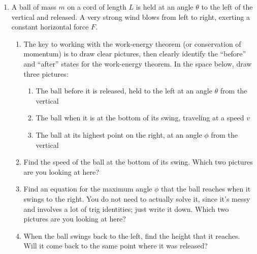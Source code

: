 \documentclass[12pt]{article}
\begin{document}
\begin{enumerate}
 \item{A ball of mass $m$ on a cord of length $L$ is held at an angle $\theta$ to the left of the vertical and released. A very strong wind blows from left to right, exerting a constant horizontal force $F$. }

     \begin{enumerate}
     	\item The key to working with the work-energy theorem (or conservation of momentum) is to draw clear pictures, then clearly identify the ``before'' and ``after'' states for the work-energy theorem.
     	     	In the space below, draw three pictures: 
     	\begin{enumerate}
     		\item The ball before it is released, held to the left at an angle $\theta$ from the vertical
     		\item The ball when it is at the bottom of its swing, traveling at a speed $v$
     		\item The ball at its highest point on the right, at an angle $\phi$ from the vertical
     	\end{enumerate}
     	
     	\newpage
       \item{Find the speed of the ball at the bottom of its swing. Which two pictures are you looking at here?}
       
      \vspace{4in}
       \item{Find an equation for the maximum angle $\phi$ that the ball reaches when it swings to the right. You do not need to actually solve it, since it's messy and involves a lot of trig identities; just write it down. Which two pictures are you looking at here?}
       
       \newpage
       
       \vspace{3in}
 
       \item{When the ball swings back to the left, find the height that it reaches. Will it come
         back to the same point where it was released?}
     
     \vspace{1in}
     \end{enumerate}
 \end{enumerate}
 
\end{document}
